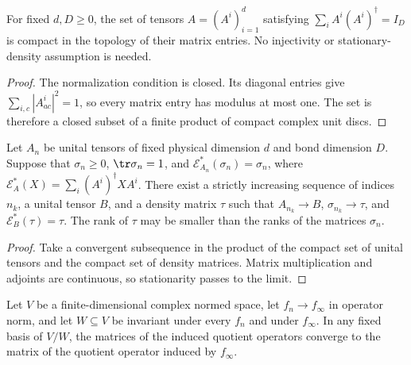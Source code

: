 \begin{lemma}
    \label{thm:spc_aux_compact_unital_tensors}
    \leanok
    For fixed $d,D\geq 0$, the set of tensors $A=(A^i)_{i=1}^d$ satisfying
    $\sum_i A^i(A^i)^\dagger=I_D$ is compact in the topology of their
    matrix entries. No injectivity or stationary-density assumption is needed.
\end{lemma}

\begin{proof}\leanok
    The normalization condition is closed. Its diagonal entries give
    $\sum_{i,c}|A^i_{ac}|^2=1$, so every matrix entry has modulus at most
    one. The set is therefore a closed subset of a finite product of
    compact complex unit discs.
\end{proof}

\begin{lemma}
    \label{thm:spc_aux_unital_stationary_subsequence}
    \leanok
    Let $A_n$ be unital tensors of fixed physical dimension $d$ and bond
    dimension $D$. Suppose that $\sigma_n\geq 0$, $\tr\sigma_n=1$, and
    $\mathcal E_{A_n}^*(\sigma_n)=\sigma_n$, where
    $\mathcal E_A^*(X)=\sum_i(A^i)^\dagger X A^i$.
    There exist a strictly increasing sequence of indices $n_k$, a unital
    tensor $B$, and a density matrix $\tau$ such that
    $A_{n_k}\to B$, $\sigma_{n_k}\to\tau$, and
    $\mathcal E_B^*(\tau)=\tau$. The rank of $\tau$ may be smaller than
    the ranks of the matrices $\sigma_n$.
\end{lemma}

\begin{proof}\leanok
    Take a convergent subsequence in the product of the compact set of
    unital tensors and the compact set of density matrices. Matrix
    multiplication and adjoints are continuous, so stationarity passes
    to the limit.
\end{proof}

\begin{lemma}
    \label{thm:spc_aux_quotient_operator_limit}
    \leanok
    Let $V$ be a finite-dimensional complex normed space, let
    $f_n\to f_\infty$ in operator norm, and let $W\subseteq V$ be invariant
    under every $f_n$ and under $f_\infty$. In any fixed basis of $V/W$,
    the matrices of the induced quotient operators converge to the
    matrix of the quotient operator induced by $f_\infty$.
\end{lemma}

